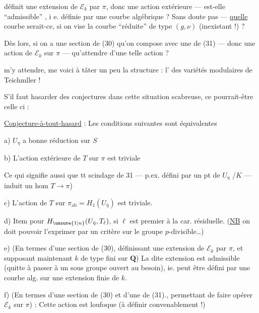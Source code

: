 définit une extension de $\mathcal E_k$ par $\pi$, donc une action extérieure --- est-elle ``admissible'' , i e. définie par une courbe algébrique ? Sans doute pas --- \uline{quelle} courbe serait-ce, si on vise la courbe ``réduite'' de type $(g,\nu)$ (inexistant !) ?

Dès lors, si on a une section de (30) qu'on compose avec une de (31) --- donc une action  de $\mathcal E_k$ sur $\pi$ --- qu'attendre d'une telle action ?

 m'y attendre, me voici à tâter un peu la structure : l' des variétés modulaires de Teichmller !

S'il faut hasarder des conjectures dans cette situation scabreuse, ce pourrait-être celle ci :

\uline{Conjecture-à-tout-hasard} : Les conditions suivantes sont équivalentes

\noindent a) $U_\eta$ a bonne réduction sur $S$

\noindent b) L'action extérieure de $T$ sur $\pi$ est triviale

Ce qui signifie aussi que tt  scindage
de 31 --- p.ex. défini par un pt de $U_\eta$
/$K$ --- induit un hom $T\longrightarrow\pi$)

\noindent c) L'action de $T$ sur $\pi_{\mathrm{ab}}=H_1(U_{\bar\eta})$ est
triviale.

\noindent d) Item pour $H_{\unsure{1|n}}(U_{\bar\eta},T_\ell)$, si $\ell$ est premier
à la car. résiduelle. (\uline{NB}  \unsure{,|)}
on doit pouvoir l'exprimer par un critère
sur le groupe $p$-divisible\ldots)

\noindent e) (En termes d'une section de (30),
définissant une extension de $\mathcal E_k$ par $\pi$,
et supposant maintenant $k$ de type
fini sur $\mathbf Q$) La dite extension est
admissible (quitte à passer à un
sous groupe ouvert  au besoin), ie.
peut être défini par une courbe alg.
sur  une extension finie de $k$.

\noindent f) (En termes d'une section de (30)
et d'une de (31)., permettant de
faire opérer $\mathcal E_k$ sur $\pi$) : Cette
action est  loufoque (à définir convenablement !)%
